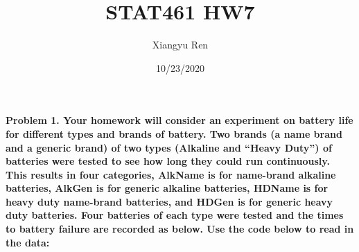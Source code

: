 \documentclass[
]{article}
\title{STAT461 HW7}
\author{Xiangyu Ren}
\date{10/23/2020}
\begin{document}
\maketitle

\hypertarget{problem-1.-your-homework-will-consider-an-experiment-on-battery-life-for-different-types-and-brands-of-battery.-two-brands-a-name-brand-and-a-generic-brand-of-two-types-alkaline-and-heavy-duty-of-batteries-were-tested-to-see-how-long-they-could-run-continuously.-this-results-in-four-categories-alkname-is-for-name-brand-alkaline-batteries-alkgen-is-for-generic-alkaline-batteries-hdname-is-for-heavy-duty-name-brand-batteries-and-hdgen-is-for-generic-heavy-duty-batteries.-four-batteries-of-each-type-were-tested-and-the-times-to-battery-failure-are-recorded-as-below.-use-the-code-below-to-read-in-the-data}{%
\paragraph{Problem 1. Your homework will consider an experiment on
battery life for different types and brands of battery. Two brands (a
name brand and a generic brand) of two types (Alkaline and ``Heavy
Duty'') of batteries were tested to see how long they could run
continuously. This results in four categories, AlkName is for name-brand
alkaline batteries, AlkGen is for generic alkaline batteries, HDName is
for heavy duty name-brand batteries, and HDGen is for generic heavy duty
batteries. Four batteries of each type were tested and the times to
battery failure are recorded as below. Use the code below to read in the
data:}\label{problem-1.-your-homework-will-consider-an-experiment-on-battery-life-for-different-types-and-brands-of-battery.-two-brands-a-name-brand-and-a-generic-brand-of-two-types-alkaline-and-heavy-duty-of-batteries-were-tested-to-see-how-long-they-could-run-continuously.-this-results-in-four-categories-alkname-is-for-name-brand-alkaline-batteries-alkgen-is-for-generic-alkaline-batteries-hdname-is-for-heavy-duty-name-brand-batteries-and-hdgen-is-for-generic-heavy-duty-batteries.-four-batteries-of-each-type-were-tested-and-the-times-to-battery-failure-are-recorded-as-below.-use-the-code-below-to-read-in-the-data}}
\end{document}
